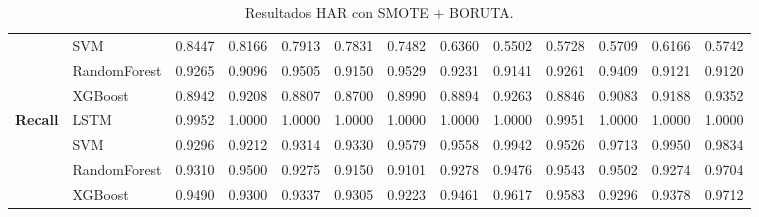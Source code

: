 \begin{table}[h]
\begin{adjustbox}{max width=15cm}
\begin{tabular}{|c|l|r|r|r|r|r|r|r|r|r|r|r|}
			& SVM &  0.8447 &  0.8166 &  0.7913 &  0.7831 &  0.7482 &  0.6360 &  0.5502 &  0.5728 &  0.5709 &  0.6166 &  0.5742 \\
			& RandomForest &  0.9265 &  0.9096 &  0.9505 &  0.9150 &  0.9529 &  0.9231 &  0.9141 &  0.9261 &  0.9409 &  0.9121 &  0.9120 \\
			& XGBoost &  0.8942 &  0.9208 &  0.8807 &  0.8700 &  0.8990 &  0.8894 &  0.9263 &  0.8846 &  0.9083 &  0.9188 &  0.9352 \\
			\hline
			\textbf{Recall} & LSTM &  0.9952 &  1.0000 &  1.0000 &  1.0000 &  1.0000 &  1.0000 &  1.0000 &  0.9951 &  1.0000 &  1.0000 &  1.0000 \\
			& SVM &  0.9296 &  0.9212 &  0.9314 &  0.9330 &  0.9579 &  0.9558 &  0.9942 &  0.9526 &  0.9713 &  0.9950 &  0.9834 \\
			& RandomForest &  0.9310 &  0.9500 &  0.9275 &  0.9150 &  0.9101 &  0.9278 &  0.9476 &  0.9543 &  0.9502 &  0.9274 &  0.9704 \\
			& XGBoost &  0.9490 &  0.9300 &  0.9337 &  0.9305 &  0.9223 &  0.9461 &  0.9617 &  0.9583 &  0.9296 &  0.9378 &  0.9712 \\
			\hline
		\end{tabular}
	\end{adjustbox}
	\caption{Resultados HAR con SMOTE + BORUTA.}
	\label{tab:HAR_SMOTE_BORUTA}
\end{table}

